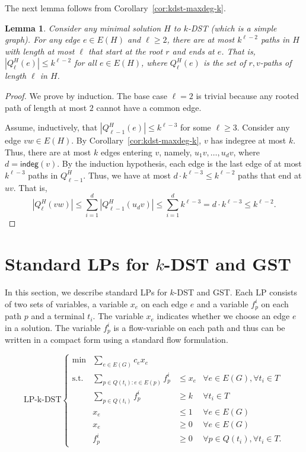 \documentclass[11pt]{article}
\newtheorem{lemma}[theorem]{Lemma}
\theoremstyle{definition}
\theoremstyle{remark}
\newcommand{\indeg}{\mathsf{indeg}}
\begin{document}
The next lemma follows from Corollary~\ref{cor:kdst-maxdeg-k}.

\begin{lemma}
\label{lem:no-of-paths-k-DST}
Consider any minimal solution $H$ to $k$-DST
(which is a simple graph).
For any edge $e\in E(H)$ and $\ell\geq 2$, 
there are at most $k^{\ell-2}$ paths in $H$ with length at most $\ell$
that start at the root $r$ and ends at $e$.
That is, 
$|Q^H_{\ell}(e)| \leq k^{\ell-2}$ for all $e\in E(H)$,
where $Q^H_{\ell}(e)$ is 
the set of $r,v$-paths of length $\ell$ in $H$. 
\end{lemma}
\begin{proof}
We prove by induction.
The base case $\ell=2$ is trivial because any rooted path of
length at most $2$ cannot have a common edge.

Assume, inductively, that $|Q^H_{\ell-1}(e)| \leq k^{\ell-3}$ 
for some $\ell \geq 3$. 
Consider any edge $vw\in E(H)$.
By Corollary~\ref{cor:kdst-maxdeg-k}, $v$ has indegree at most $k$.
Thus, there are at most $k$ edges entering $v$, namely,
$u_1v,\ldots,u_dv$, where $d=\indeg(v)$. 
By the induction hypothesis, each edge is the last edge of at most
$k^{\ell-3}$ paths in $Q^H_{\ell-1}$. 
Thus, we have at most $d \cdot k^{\ell-3} \leq k^{\ell-2}$ paths that
end at $uv$. That is,
\[
|Q^H_{\ell}(vw)| 
  \leq \sum_{i=1}^d|Q^H_{\ell-1}(u_dv)|
  \leq \sum_{i=1}^dk^{\ell-3}
  = d \cdot k^{\ell-3}
  \leq k^{\ell-2}.
\]
\end{proof}




\section{Standard LPs for $k$-DST and GST}
\label{sec:standard-LPs}

In this section, we describe standard LPs for $k$-DST and GST. 
Each LP consists of two sets of variables, 
a variable $x_e$ on each edge $e$ and 
a variable $f^i_p$ on each path $p$ and a terminal $t_i$.
The variable $x_e$ indicates whether we choose an edge $e$
in a solution.
The variable $f^i_p$ is a flow-variable on each path and 
thus can be written in a compact form 
using a standard flow formulation.

\[
\mbox{LP-k-DST}\left\{
\begin{array}{lrll}
  \min & \sum_{e\in E(G)}c_ex_e\\
  \mbox{s.t.}
    & \sum_{p\in Q(t_i):e\in E(p)}f^i_p  &\leq x_e  & \forall e\in E(G), 
                                     \forall t_i\in T\\
    & \sum_{p\in Q(t_i)}f^i_p &\geq k & \forall t_i\in T\\
    & x_e                &\leq 1   & \forall e\in E(G)\\
    & x_e                &\geq 0   & \forall e\in E(G)\\
    & f^i_p              &\geq 0   & \forall p\in Q(t_i), 
                                     \forall t_i\in T.
\end{array}
\right. 
\]
\end{document}
